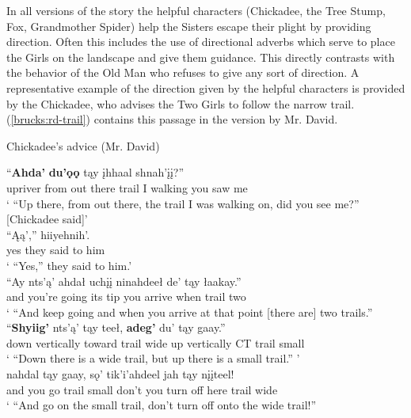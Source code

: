 In all versions of the story the helpful characters (Chickadee, the Tree Stump, Fox, Grandmother Spider) help the Sisters escape their plight by providing direction. Often this includes the use of directional adverbs which serve to place the Girls on the landscape and give them guidance. This directly contrasts with the behavior of the Old Man who refuses to give any sort of direction. A representative example of the direction given by the helpful characters is provided by the Chickadee, who advises the Two Girls to follow the narrow trail. (\ref{brucks:rd-trail}) contains this passage in the version by Mr. David.

\begin{exe}
\ex Chickadee's advice (Mr. David) \label{brucks:rd-trail}
\begin{xlist}
\ex \gll ``\textbf{Ahda'} \textbf{du'ǫǫ} tąy įhhaal shnah'įį?''  \\
 upriver {from out there} trail {I walking} {you saw me} \\
\glt ` ``Up there, from out there, the trail I was walking on, did you see me?'' [Chickadee said]' \\

\ex \gll ``Ąą','' hiiyehnih'.  \\
 yes {they said to him} \\
\glt ` ``Yes,'' they said to him.' \\

\ex \gll ``{Ay nts'ą'} ahdał uchįį ninahdeeł de' tąy łaakay.''  \\
 and {you're going} {its tip} {you arrive} when trail two \\
\glt ` ``And keep going and when you arrive at that point [there are] two trails.'' \\

\ex \gll ``\textbf{Shyiig'} nts'ą' tąy teeł, \textbf{adeg'} du' tąy gaay.''  \\
 {down vertically} toward trail wide {up vertically} CT trail small \\
\glt ` ``Down there is a wide trail, but up there is a small trail.'' ' \\

\ex {} nahdal tąy gaay, sǫ' tik'i'ahdeel jah tąy nįįteel!  \\
 and {you go} trail small don't {you turn off} here trail wide \\
\glt ` ``And go on the small trail, don't turn off onto the wide trail!'' \\


\end{xlist}
\end{exe}
